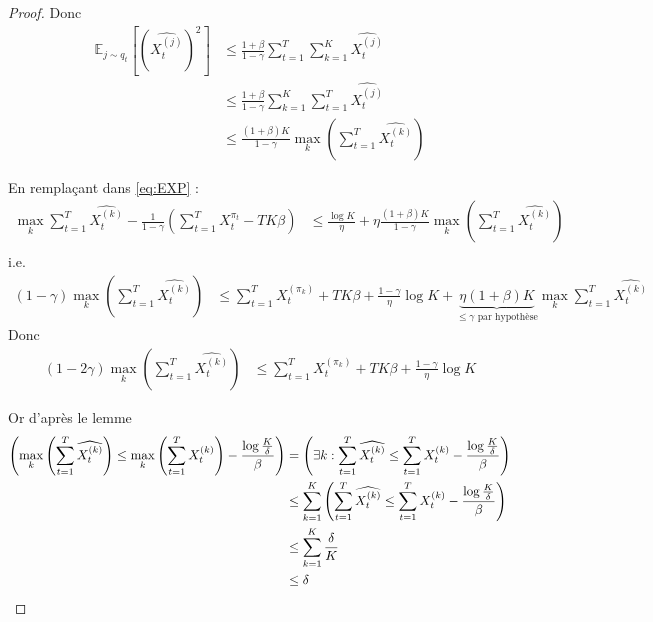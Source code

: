 \documentclass{article}
\let\P\relax
\DeclareMathOperator*{\P}{\mathbb{P}}
\theoremstyle{remark}
\theoremstyle{remark}
\begin{document}
\begin{proof}
   Donc
   \begin{align*}
      \mathbb{E}_{j \sim q_t}\left[\left(\widehat{X_t^{(j)}}\right)^2\right] &\leq \frac{1 + \beta}{1 - \gamma} \sum_{t=1}^T \sum_{k=1}^K \widehat{X_t^{(j)}} \\
      &\leq \frac{1 + \beta}{1 - \gamma} \sum_{k=1}^K \sum_{t=1}^T \widehat{X_t^{(j)}} \\
      &\leq \frac{(1 + \beta) K}{1 - \gamma} \max_k \left( \sum_{t=1}^T \widehat{X_t^{(k)}} \right)
   \end{align*}

   En remplaçant dans \eqref{eq:EXP} :
   \begin{align*}
      \max_k \sum_{t=1}^T \widehat{X_t^{(k)}} - \frac{1}{1-\gamma} \left( \sum_{t=1}^T X_t^{\pi_t} - T K \beta \right) &\leq \frac{\log K}{\eta} + \eta \frac{(1 + \beta) K}{1 - \gamma} \max_k \left( \sum_{t=1}^T \widehat{X_t^{(k)}} \right) \\
   \end{align*}
   i.e.
   \begin{align*}
      (1-\gamma) \max_k \left( \sum_{t=1}^T \widehat{X_t^{(k)}} \right) &\leq \sum_{t=1}^T X_t^{(\pi_k)} + T K \beta + \frac{1-\gamma}{\eta} \log K + \underbrace{\eta (1+\beta) K }_{\leq \gamma \text{ par hypothèse}} \max_k \sum_{t=1}^T \widehat{X_t^{(k)}}
   \end{align*}
   Donc
   \begin{align*}
      (1-2\gamma) \max_k \left( \sum_{t=1}^T \widehat{X_t^{(k)}} \right) &\leq \sum_{t=1}^T X_t^{(\pi_k)} + T K \beta + \frac{1-\gamma}{\eta} \log K
   \end{align*}

   Or d'après le lemme
   \begin{align*}
      \P\left( \max_k \left( \sum_{t=1}^T \widehat{X_t^{(k)}} \right) \leq \max_k \left( \sum_{t=1}^T X_t^{(k)} \right) - \frac{\log \frac K \delta}{\beta} \right) &= \P\left( \exists k :  \sum_{t=1}^T \widehat{X_t^{(k)}} \leq  \sum_{t=1}^T X_t^{(k)} - \frac{\log \frac K \delta}{\beta} \right) \\
      &\leq \sum_{k=1}^K \P\left( \sum_{t=1}^T \widehat{X_t^{(k)}} \leq  \sum_{t=1}^T X_t^{(k)} - \frac{\log \frac K \delta}{\beta} \right) \\
      &\leq \sum_{k=1}^K \frac \delta K \\
      &\leq \delta
   \end{align*}


\end{proof}
\end{document}
